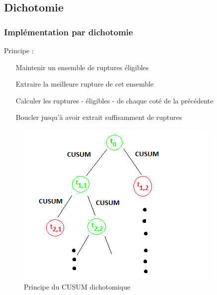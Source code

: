 \documentclass{beamer}
\begin{document}
\subsection{Dichotomie}

\begin{frame}

\frametitle{Implémentation par dichotomie}

Principe : %

\begin{itemize}
	\item[Maintenir] un ensemble de ruptures éligibles
	\item[Extraire] la meilleure rupture de cet ensemble
	\item[Calculer] les ruptures - éligibles - de chaque coté de la précédente
	\item[Boucler] jusqu'à avoir extrait suffisamment de ruptures
\end{itemize}

\begin{figure}
	\includegraphics[scale=0.45]{diagramme_cusum_dikt.png}
	\caption{Principe du CUSUM dichotomique}
\end{figure}



\end{frame}
\end{document}

